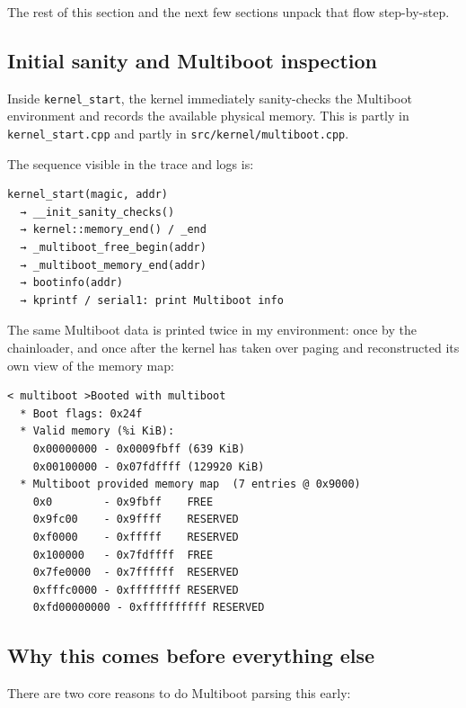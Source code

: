 \documentclass[a4paper,11pt]{article}
\begin{document}
The rest of this section and the next few sections unpack that flow
step-by-step.

\subsection{Initial sanity and Multiboot inspection}

Inside \texttt{kernel\_start}, the kernel immediately sanity-checks the
Multiboot environment and records the available physical memory. This is
partly in \texttt{kernel\_start.cpp} and partly in
\texttt{src/kernel/multiboot.cpp}.

The sequence visible in the trace and logs is:

\begin{verbatim}
kernel_start(magic, addr)
  → __init_sanity_checks()
  → kernel::memory_end() / _end
  → _multiboot_free_begin(addr)
  → _multiboot_memory_end(addr)
  → bootinfo(addr)
  → kprintf / serial1: print Multiboot info
\end{verbatim}

The same Multiboot data is printed twice in my environment: once by the
chainloader, and once after the kernel has taken over paging and
reconstructed its own view of the memory map:

\begin{verbatim}
< multiboot >Booted with multiboot
  * Boot flags: 0x24f
  * Valid memory (%i KiB):
    0x00000000 - 0x0009fbff (639 KiB)
    0x00100000 - 0x07fdffff (129920 KiB)
  * Multiboot provided memory map  (7 entries @ 0x9000)
    0x0        - 0x9fbff    FREE
    0x9fc00    - 0x9ffff    RESERVED
    0xf0000    - 0xfffff    RESERVED
    0x100000   - 0x7fdffff  FREE
    0x7fe0000  - 0x7ffffff  RESERVED
    0xfffc0000 - 0xffffffff RESERVED
    0xfd00000000 - 0xffffffffff RESERVED
\end{verbatim}

\subsection{Why this comes before everything else}

There are two core reasons to do Multiboot parsing this early:
\end{document}
